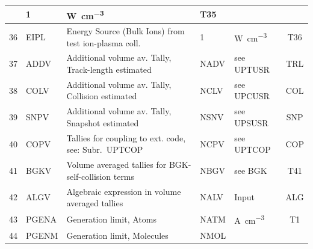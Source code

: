 \begin{landscape}
\begin{longtable}{|r|l|l|l|l|c|}
					     & 1                                &
    \si{\watt\per\cubic\centi\metre}         & T35
    \\  \hline
    36                                       & EIPL                             & Energy
    Source (Bulk Ions) from test ion-plasma coll.
					     & 1                                &
    \si{\watt\per\cubic\centi\metre}         & T36
    \\  \hline
    37                                       & ADDV                             &
    Additional volume av.
    Tally, Track-length estimated            & NADV                             & see UPTUSR
					     & TRL                                           \\
    \hline
    38                                       & COLV                             &
    Additional volume av.
    Tally, Collision estimated               & NCLV                             & see UPCUSR
					     & COL                                           \\
    \hline
    39                                       & SNPV                             &
    Additional volume av.
    Tally, Snapshot estimated                & NSNV                             & see UPSUSR
					     & SNP                                           \\
    \hline
    40                                       & COPV                             &
    Tallies for coupling to ext. code, see: Subr.\ UPTCOP
					     & NCPV                             & see
    UPTCOP                                   & COP
    \\  \hline
    41                                       & BGKV                             & Volume
    averaged tallies for \acs{BGK}-self-collision terms
					     & NBGV                             & see
    BGK                                      & T41
    \\  \hline
    42                                       & ALGV                             &
    Algebraic expression in volume averaged tallies
					     & NALV                             & Input
					     & ALG
    \\  \hline
    43                                       & PGENA                            &
    Generation limit, Atoms                  & NATM                             &
    \si{\ampere\per\cubic\centi\metre}       & T1
    \\ \hline
    44                                       & PGENM                            &
    Generation limit, Molecules              & NMOL                             &

\end{longtable}
\end{landscape}
